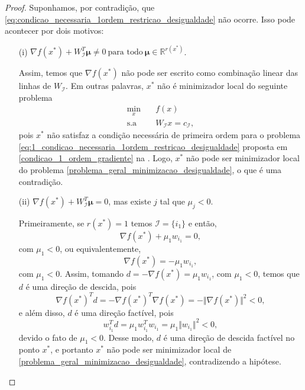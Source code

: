 \documentclass[12pt,a4paper]{scrartcl}
\def\RR{\mathds{R}}
\theoremstyle{definition}%
\begin{document}
\begin{proof}
Suponhamos, por contradição, que \eqref{eq:condicao_necessaria_1ordem_restricao_desigualdade} não ocorre. Isso pode acontecer por dois motivos:
\begin{enumerate}
\item[(i)] $\nabla f(x^{*}) + W_{\mathcal{I}}^{T} \boldsymbol{\mu} \neq 0 \ \text{para todo} \ \boldsymbol{\mu} \in \RR^{r(x^{*})}$.

Assim, temos que $\nabla f(x^{*})$ não pode ser escrito como combinação linear das linhas de $W_{\mathcal{I}}$. Em outras palavras, $x^{*}$ não é minimizador local do seguinte problema
\[ \label{eq:1_condicao_necessaria_1ordem_restricao_desigualdade}
\begin{aligned}
\min_{x} & \quad f(x) \\
\text{s.a} & \quad W_{\mathcal{I}}x=c_{\mathcal{I}} ,
\end{aligned}
\]
pois $x^{*}$ não satisfaz a condição necessária de primeira ordem para o problema \eqref{eq:1_condicao_necessaria_1ordem_restricao_desigualdade} proposta em \eqref{condicao_1_ordem_gradiente} na . Logo, $x^{*}$ não pode ser minimizador local do problema \eqref{problema_geral_minimizacao_desigualdade}, o que é uma contradição.

\item[(ii)] $\nabla f(x^{*}) + W_{\mathcal{I}}^{T} \boldsymbol{\mu} = 0$, mas existe $j$ tal que $\mu_{j} <0$.

Primeiramente, se $r(x^{*}) = 1$ temos $\mathcal{I} = \{ i_{1} \}$ e então, 
\[
\nabla f(x^{*}) + \mu_{1} w_{i_{1}} =0 ,
\]
com $\mu_{1} <0$, ou equivalentemente, 
\[
\nabla f(x^{*}) = - \mu_{1} w_{i_{1}} ,
\]
com $\mu_{1} <0$. Assim, tomando $d=-\nabla f(x^{*}) = \mu_{1} w_{i_{1}}$, com $\mu_{1} <0$, temos que $d$ é uma direção de descida, pois
\[
\nabla f(x^{*})^{T}d = -\nabla f(x^{*})^{T} \nabla f(x^{*}) = -\Vert \nabla f(x^{*}) \Vert^{2} <0,
\]
e além disso, $d$ é uma direção factível, pois
\[
w_{i_{1}}^{T}d = \mu_{1} w_{i_{1}}^{T}w_{i_{1}} = \mu_{1} \Vert w_{i_{1}} \Vert^{2} < 0,
\]
devido o fato de $\mu_{1} <0$. Desse modo, $d$ é uma direção de descida factível no ponto $x^{*}$, e portanto $x^{*}$ não pode ser minimizador local de \eqref{problema_geral_minimizacao_desigualdade}, contradizendo a hipótese.


\end{enumerate}
\end{proof}
\end{document}

